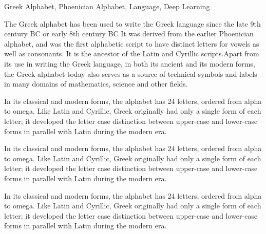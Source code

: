 \documentclass[doctor]{dutthesis} %
\begin{document}
\begin{englishabstract}{Greek Alphabet, Phoenician Alphabet, Language, Deep Learning}

The Greek alphabet has been used to write the Greek language since the late 9th
century BC or early 8th century BC It was derived from the earlier
Phoenician alphabet, and was the first alphabetic script to have distinct
letters for vowels as well as consonants. It is the ancestor of the Latin
and Cyrillic scripts.Apart from its use in writing the Greek language, in
both its ancient and its modern forms, the Greek alphabet today also serves
as a source of technical symbols and labels in many domains of mathematics,
science and other fields. \par
In its classical and modern forms, the alphabet has 24 letters, ordered from
alpha to omega. Like Latin and Cyrillic, Greek originally had only a single
form of each letter; it developed the letter case distinction between
upper-case and lower-case forms in parallel with Latin during the modern era.

In its classical and modern forms, the alphabet has 24 letters, ordered from
alpha to omega. Like Latin and Cyrillic, Greek originally had only a single
form of each letter; it developed the letter case distinction between
upper-case and lower-case forms in parallel with Latin during the modern era.

In its classical and modern forms, the alphabet has 24 letters, ordered from
alpha to omega. Like Latin and Cyrillic, Greek originally had only a single
form of each letter; it developed the letter case distinction between
upper-case and lower-case forms in parallel with Latin during the modern era.



\end{englishabstract}
\end{document}
